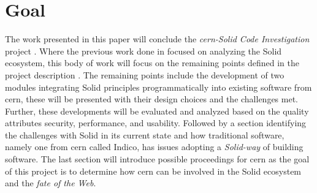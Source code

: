\section{Goal}

The work presented in this paper will conclude the \textit{\gls{cern}-Solid Code Investigation} project \cite{cern-solid-code-investigation-project-description}. Where the previous work done in \cite{cern-solid-investigation-spec} focused on analyzing the Solid ecosystem, this body of work will focus on the remaining points defined in the project description \cite{cern-solid-code-investigation-project-description}. The remaining points include the development of two modules integrating Solid principles programmatically into existing software from \gls{cern}, these will be presented with their design choices and the challenges met. Further, these developments will be evaluated and analyzed based on the quality attributes security, performance, and usability. Followed by a section identifying the challenges with Solid in its current state and how traditional software, namely one from \gls{cern} called Indico, has issues adopting a \textit{Solid-way} of building software. The last section will introduce possible proceedings for \gls{cern} as the goal of this project is to determine how \gls{cern} can be involved in the Solid ecosystem and the \textit{fate of the Web}.
